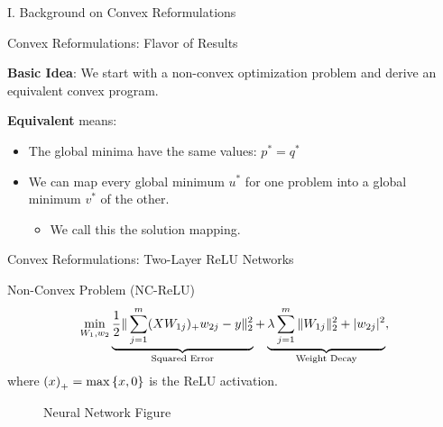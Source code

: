 \documentclass[usenames,dvipsnames,mathserif,notheorems]{beamer}
\newcommand{\bad}[1]{\textcolor{bad}{#1}}
\newcommand{\good}[1]{\textcolor{good}{#1}}
\def\showtikz{}
\begin{document}
\begin{frame}{}
	\begin{center}
		\huge I. Background on Convex Reformulations
	\end{center}
\end{frame}

\begin{frame}{Convex Reformulations: Flavor of Results}
	\large

	\textbf{Basic Idea}: We start with a \bad{non-convex} optimization problem and derive
	an equivalent \good{convex} program.

	\pause
	\vspace{2em}

	\textbf{Equivalent} means:
	\vspace{0.5em}
	\begin{itemize}
		\item The global minima have the same values: \( p^* = q^* \)
		      \vspace{0.5em}
		\item We can map every global minimum \( u^* \) for one problem into
		      a global minimum \( v^* \) of the other.
		      \vspace{0.5em}

		      \begin{itemize}
			      \item We call this the \good{solution mapping}.
		      \end{itemize}
	\end{itemize}

\end{frame}


\begin{frame}{Convex Reformulations: Two-Layer ReLU Networks}

	{\large \bad{Non-Convex Problem} (NC-ReLU)}
	\[
		\min_{W_1, w_2} \underbrace{\frac 1 2 \|\sum_{j=1}^m (X W_{1j})_+ w_{2j} - y\|_2^2}_{\text{Squared Error}}
		+ \underbrace{\lambda \sum_{j=1}^m \|W_{1j}\|_2^2 + |w_{2j}|^2}_{\text{Weight Decay}},
	\]
	where \( \left(x\right)_+ = \max\left\{x, 0\right\} \) is the ReLU activation.
	\pause

	\begin{figure}[]
		\centering
		\ifdefined\showtikz
			
		\else
			\Huge Neural Network Figure
		\fi
	\end{figure}

\end{frame}
\end{document}
